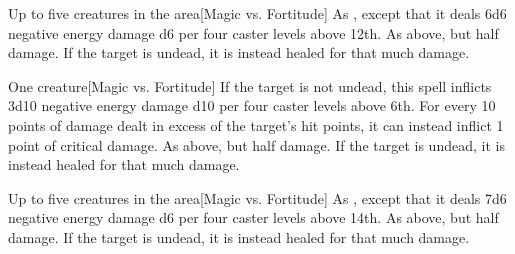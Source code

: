 \begin{spellheader}
\end{spellheader}
\begin{spelleffects}
    \begin{spelltargets}{Up to five creatures in the area}[Magic vs. Fortitude]
        \spellsuccess As , except that it deals 6d6 negative energy damage \add d6 per four caster levels above 12th.
        \spellfailure As above, but half damage.
        \spelleffect If the target is undead, it is instead healed for that much damage.
    \end{spelltargets}
\end{spelleffects}
\begin{spellfooter}
    
\end{spellfooter}

\begin{spellheader}
    \spellrng{\rngclose}
\end{spellheader}
\begin{spelleffects}
    \begin{spelltarget}{One creature}[Magic vs. Fortitude]
        \spellsuccess If the target is not undead, this spell inflicts 3d10 negative energy damage \add d10 per four caster levels above 6th. For every 10 points of damage dealt in excess of the target's hit points, it can instead inflict 1 point of critical damage.
        \spellfailure As above, but half damage.
        \spelleffect If the target is undead, it is instead healed for that much damage.
    \end{spelltarget}
\end{spelleffects}
\begin{spellfooter}
    
\end{spellfooter}

\begin{spellheader}
\end{spellheader}
\begin{spelleffects}
    \begin{spelltargets}{Up to five creatures in the area}[Magic vs. Fortitude]
        \spellsuccess As , except that it deals 7d6 negative energy damage \add d6 per four caster levels above 14th.
        \spellfailure As above, but half damage.
        \spelleffect If the target is undead, it is instead healed for that much damage.
    \end{spelltargets}
\end{spelleffects}
\begin{spellfooter}
    
\end{spellfooter}

